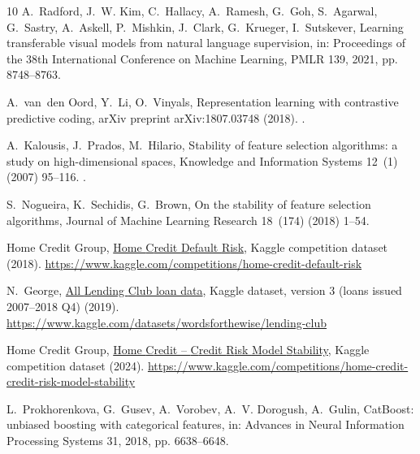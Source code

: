 \documentclass[preprint,12pt]{elsarticle}
\begin{document}
\begin{thebibliography}{10}
A.~Radford, J.~W. Kim, C.~Hallacy, A.~Ramesh, G.~Goh, S.~Agarwal, G.~Sastry,
  A.~Askell, P.~Mishkin, J.~Clark, G.~Krueger, I.~Sutskever, Learning
  transferable visual models from natural language supervision, in: Proceedings
  of the 38th International Conference on Machine Learning, PMLR 139, 2021, pp.
  8748--8763.

A.~van~den Oord, Y.~Li, O.~Vinyals, Representation learning with contrastive
  predictive coding, arXiv preprint arXiv:1807.03748 (2018).
\newblock \href {https://doi.org/10.48550/arXiv.1807.03748}
  {}.

A.~Kalousis, J.~Prados, M.~Hilario, Stability of feature selection algorithms:
  a study on high-dimensional spaces, Knowledge and Information Systems 12~(1)
  (2007) 95--116.
\newblock \href {https://doi.org/10.1007/s10115-006-0040-8}
  {}.

S.~Nogueira, K.~Sechidis, G.~Brown, On the stability of feature selection
  algorithms, Journal of Machine Learning Research 18~(174) (2018) 1--54.

{Home Credit Group},
  \href{https://www.kaggle.com/competitions/home-credit-default-risk}{Home
  {C}redit {D}efault {R}isk}, Kaggle competition dataset (2018).
\newline\urlprefix\url{https://www.kaggle.com/competitions/home-credit-default-risk}

N.~George,
  \href{https://www.kaggle.com/datasets/wordsforthewise/lending-club}{All
  {L}ending {C}lub loan data}, Kaggle dataset, version 3 (loans issued
  2007--2018 Q4) (2019).
\newline\urlprefix\url{https://www.kaggle.com/datasets/wordsforthewise/lending-club}

{Home Credit Group},
  \href{https://www.kaggle.com/competitions/home-credit-credit-risk-model-stability}{Home
  {C}redit -- {C}redit {R}isk {M}odel {S}tability}, Kaggle competition dataset
  (2024).
\newline\urlprefix\url{https://www.kaggle.com/competitions/home-credit-credit-risk-model-stability}

L.~Prokhorenkova, G.~Gusev, A.~Vorobev, A.~V. Dorogush, A.~Gulin, {CatBoost}:
  unbiased boosting with categorical features, in: Advances in Neural
  Information Processing Systems 31, 2018, pp. 6638--6648.


\end{thebibliography}
\end{document}
